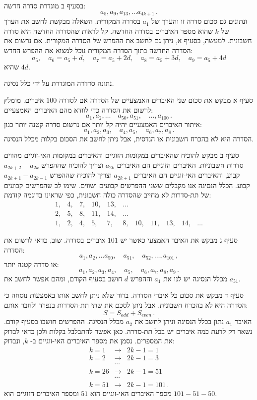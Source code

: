 \documentclass[12pt,a4paper]{article}
\begin{document}
בסעיף ב מוגדרת סדרה חדשה:
\[
a_5, a_9, a_{13},\ldots a_{4k+1}\,.
\]
ונתונים גם סכום סדרה זו והערך של
$a_1$
בסדרה המקורית. השאלה מבקשת לחשב את הערך של
$k$
שהוא מספר האיברים בסדרה החדשה. קל לראות שהסדרה החדשה היא סדרה חשבונית. למעשה, בסעיף א, ניתן גם לחשב את ההפרש של הסדרה המקורית. אם נרשום את הסדרה החדשה בתוך הסדרה המקורית נוכל למצוא את ההפרש החדש:
\[
a_5, \quad a_6=a_5+d,\quad  a_7=a_5+2d,\quad  a_8=a_5+3d,\quad  a_9=a_5+4d
\]
שהיא
$4d$.

\bigskip

\textbf{}
נתונה סדדרה המוגדרת על ידי כלל נסיגה.

סעיף א מבקש את סכום שני האיברים האמצעיים של הסדרה אם לסדרה
$100$
איברים. מומלץ לרשום את הסדרה כדי לוודא מהם האיברים האמצעיים:
\[
a_1, a_2, \ldots \quad a_{50}, a_{51}, \quad \ldots, a_{100}\,.
\]
איתור האיברים האמצעיים יהיה קל יותר אם נרשום סדרה קטנה יותר כגון:
\[
a_1, a_2, a_3, \quad a_4,a_5,\quad a_6, a_7, a_8\,.
\]
הסדרה היא לא בהכרח חשבונית או הנדסית, אבל ניתן לחשב את הסכום בקלות מכלל הנסיגה.

סעיף ב מבקש להוכיח שהאיברים במקומות הזוגיים והאיברים במקומות האי-זוגיים מהווים סדרות חשבוניות. האיברים הזוגיים הם האיברים
$a_{2k}$
וצריך להוכיח שההפרש
$a_{2k+2} - a_{2k}$
קבוע, והאיברים האי-זוגיים הם האיברים
$a_{2k+1}$
וצריך להוכיח שההפרש
$a_{2k+1} - a_{2k-1}$
קבוע. הכלל הנסיגה אנו מקבלים ששני ההפרשים קבועים ושווים. שימו לב שהפרשים קבועים של תת-סדרות לא מחייב שהסדרה כולה חשבונית, כפי שראינו בדוגמה קודמת:
\[
\begin{array}{rrrrrrrrrrr}
1,& 4,& 7,& 10,& 13,& \ldots\\
2,& 5,& 8,& 11,& 14, &\ldots\\
1,& 2,& 4,& 5,& 7,& 8,& 10,& 11,& 13,& 14, &\ldots
\end{array}
\]
\vspace{-3ex}

סעיף ג מבקש את האיבר האמצעי כאשר יש 
$101$
איברים בסדרה. שוב, כדאי לרשום את הסדרה:
\[
a_1, a_2, \ldots a_{50}, \quad a_{51}, \quad a_{52}, \ldots, a_{101}\,,
\]
או סדרה קטנה יותר:
\[
a_1, a_2, a_3, a_4, \quad a_5, \quad a_6, a_7, a_8, a_9\,.
\]
מכלל הנסיגה יש לנו את
$a_1$
וההפרש
$d$
חושב בסעיף הקודם, ומהם אפשר לחשב את
$a_{51}$.

סעיף ד מבקש את סכום כל איברי הסדרה. ברור שלא ניתן לחשב אותו באמצעות נוסחה כי הסדרה היא לא בהכרח חשבונית, אבל ניתן לסכם את שתי תת-הסדרות בנפרד ולחבר אותם:
\[
S=S_{\mathit{odd}} + S_{\mathit{even}}\,.
\]
האיבר
$a_1$
נתון בכלל הנסיגה וניתן לחשב את
$a_2$
מכלל הנסיגה. ההפרשים חושבו בסעיף קודם. נשאר רק לדעת כמה איברים יש בכל תת-סדרה. כאן אפשר להתבלבל בקלות ולכן כדאי לבדוק את המספרים. נסמן את מספר האיברים האי-זוגיים ב-%
$k$,
ונבדוק:
\begin{eqnarray*}
k = 1 &\rightarrow& 2k-1=1\\
k = 2 &\rightarrow& 2k-1=3\\
&\cdots&\\
k = 26 &\rightarrow& 2k-1=51\\
&\cdots&\\
k = 51 &\rightarrow& 2k-1=101\,.
\end{eqnarray*}
מספר האיברים האי-זוגיים הוא
$51$
ומספר האיברים הזוגיים הוא
$101-51-50$.
\end{document}
